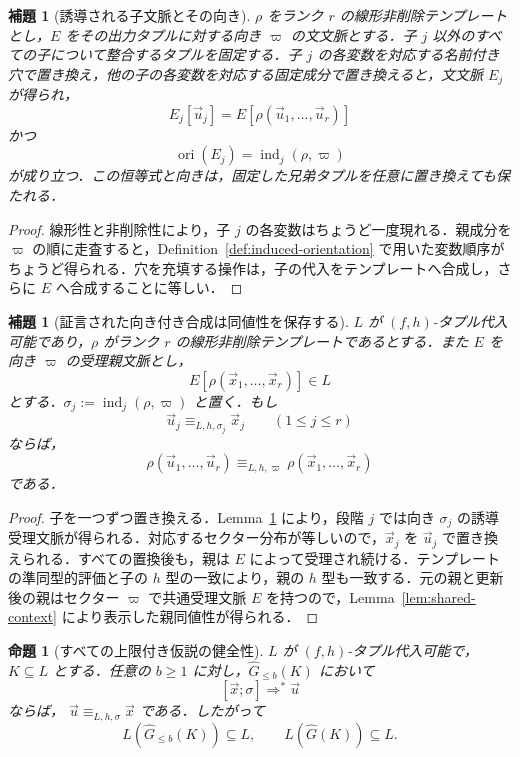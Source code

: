 \documentclass[11pt,a4paper]{ltjsarticle}
\numberwithin{equation}{section}
\theoremstyle{plain}
\newtheorem{lemma}[theorem]{補題}
\newtheorem{proposition}[theorem]{命題}
\theoremstyle{definition}
\theoremstyle{remark}
\newcommand{\tuple}[1]{\vec{#1}}
\begin{document}
\begin{lemma}[誘導される子文脈とその向き]
\label{lem:filling-identity}
\(\rho\) をランク \(r\) の線形非削除テンプレートとし，\(E\) をその出力タプルに対する向き \(\varpi\) の文文脈とする．子 \(j\) 以外のすべての子について整合するタプルを固定する．子 \(j\) の各変数を対応する名前付き穴で置き換え，他の子の各変数を対応する固定成分で置き換えると，文文脈 \(E_j\) が得られ，
\[
  E_j[\tuple u_j]=E[\rho(\tuple u_1,\ldots,\tuple u_r)]
\]
かつ
\[
  \operatorname{ori}(E_j)=\operatorname{ind}_j(\rho,\varpi)
\]
が成り立つ．この恒等式と向きは，固定した兄弟タプルを任意に置き換えても保たれる．
\end{lemma}

\begin{proof}
線形性と非削除性により，子 \(j\) の各変数はちょうど一度現れる．親成分を \(\varpi\) の順に走査すると，Definition~\ref{def:induced-orientation} で用いた変数順序がちょうど得られる．穴を充填する操作は，子の代入をテンプレートへ合成し，さらに \(E\) へ合成することに等しい．
\end{proof}

\begin{lemma}[証言された向き付き合成は同値性を保存する]
\label{lem:witnessed-composition}
\(L\) が \((f,h)\)-タプル代入可能であり，\(\rho\) がランク \(r\) の線形非削除テンプレートであるとする．また \(E\) を向き \(\varpi\) の受理親文脈とし，
\[
  E[\rho(\tuple x_1,\ldots,\tuple x_r)]\in L
\]
とする．\(\sigma_j:=\operatorname{ind}_j(\rho,\varpi)\) と置く．もし
\[
  \tuple u_j\equiv_{L,h,\sigma_j}\tuple x_j
  \qquad(1\le j\le r)
\]
ならば，
\[
  \rho(\tuple u_1,\ldots,\tuple u_r)
  \equiv_{L,h,\varpi}
  \rho(\tuple x_1,\ldots,\tuple x_r)
\]
である．
\end{lemma}

\begin{proof}
子を一つずつ置き換える．Lemma~\ref{lem:filling-identity} により，段階 \(j\) では向き \(\sigma_j\) の誘導受理文脈が得られる．対応するセクター分布が等しいので，\(\tuple x_j\) を \(\tuple u_j\) で置き換えられる．すべての置換後も，親は \(E\) によって受理され続ける．テンプレートの準同型的評価と子の \(h\) 型の一致により，親の \(h\) 型も一致する．元の親と更新後の親はセクター \(\varpi\) で共通受理文脈 \(E\) を持つので，Lemma~\ref{lem:shared-context} により表示した親同値性が得られる．
\end{proof}

\begin{proposition}[すべての上限付き仮説の健全性]
\label{prop:learner-soundness}
\(L\) が \((f,h)\)-タプル代入可能で，\(K\subseteq L\) とする．任意の \(b\ge1\) に対し，\(\widehat G_{\le b}(K)\) において
\[
  [\tuple x;\sigma]\Rightarrow^*\tuple u
\]
ならば，
\(\tuple u\equiv_{L,h,\sigma}\tuple x\)
である．したがって
\[
  L(\widehat G_{\le b}(K))\subseteq L,
  \qquad
  L(\widehat G(K))\subseteq L.
\]
\end{proposition}
\end{document}
